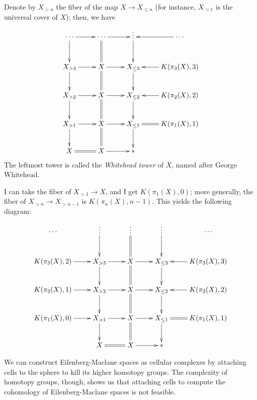 Denote by $X_{>n}$ the fiber of the map $X\to X_{\leq n}$ (for instance, $X_{>1}$ is the universal cover of $X$); then, we have
\begin{equation*}
    \xymatrix{
	\cdots\ar[r]\ar[d] & \cdots\ar[r]\ar@{=}[d] & \vdots\ar[d] & \cdots\ar[l]\\
	X_{>3}\ar[r]\ar[d] & X\ar[r]\ar@{=}[d] & X_{\leq 3}\ar[d]& K(\pi_3(X),3)\ar[l]\\
	X_{>2}\ar[r]\ar[d] & X\ar[r]\ar@{=}[d] & X_{\leq 2}\ar[d]& K(\pi_2(X),2)\ar[l]\\
	X_{>1}\ar[r]\ar[d] & X\ar[r]\ar@{=}[d] & X_{\leq 1}\ar@{=}[r]\ar[d] & K(\pi_1(X),1)\\
	X\ar@{=}[r] & X\ar[r] & \ast
    }
\end{equation*}
The leftmost tower is called the \emph{Whitehead tower} of $X$, named after George Whitehead.

I can take the fiber of $X_{>1}\to X$, and I get $K(\pi_1(X),0)$;
more generally, the fiber of $X_{>n} \to X_{>n-1}$ is $K(\pi_n(X),n-1)$.
This yields the following diagram:
\begin{equation*}
    \xymatrix{
	\cdots & \vdots\ar[d] & \vdots\ar@{=}[d] & \vdots\ar[d] & \cdots\\
	K(\pi_3(X),2)\ar[r] & X_{>3}\ar[r]\ar[d] & X\ar[r]\ar@{=}[d] & X_{\leq 3}\ar[d]& K(\pi_3(X),3)\ar[l]\\
	K(\pi_2(X),1)\ar[r] & X_{>2}\ar[r]\ar[d] & X\ar[r]\ar@{=}[d] & X_{\leq 2}\ar[d]& K(\pi_2(X),2)\ar[l]\\
	K(\pi_1(X),0)\ar[r] & X_{>1}\ar[r]\ar[d] & X\ar[r]\ar@{=}[d] & X_{\leq 1}\ar@{=}[r]\ar[d] & K(\pi_1(X),1)\\
	& X\ar@{=}[r] & X\ar[r] & \ast
    }
\end{equation*}

We can construct Eilenberg-Maclane spaces as cellular complexes by attaching cells to the sphere to kill its higher homotopy groups.
The complexity of homotopy groups, though, shows us that attaching cells to compute the cohomology of Eilenberg-Maclane spaces
is not feasible.
